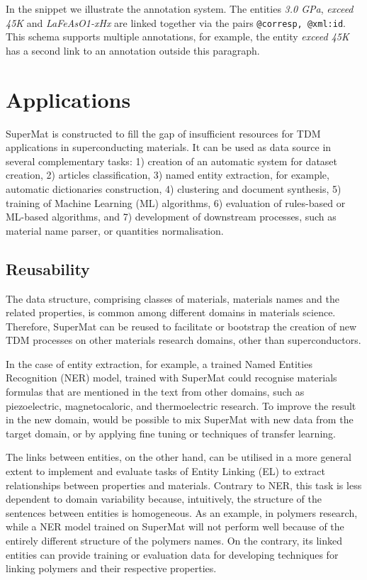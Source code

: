 \documentclass[fleqn,10pt]{wlscirep}
\begin{document}
In the snippet we illustrate the annotation system. The entities \textit{3.0 GPa}, \textit{exceed 45K} and \textit{LaFeAsO1-xHx} are linked together via the pairs \texttt{@corresp, @xml:id}. 
This schema supports multiple annotations, for example, the entity \textit{exceed 45K} has a second link to an annotation outside this paragraph.


\section*{Applications}
\label{sec:applications}
SuperMat is constructed to fill the gap of insufficient resources for TDM applications in superconducting materials. It can be used as data source in several complementary tasks: 
1) creation of an automatic system for dataset creation, 
2) articles classification, 
3) named entity extraction, for example, automatic dictionaries construction, 
4) clustering and document synthesis,
5) training of Machine Learning (ML) algorithms,
6) evaluation of rules-based or ML-based algorithms, and 
7) development of downstream processes, such as material name parser, or quantities normalisation.

\subsection*{Reusability}
The data structure, comprising classes of materials, materials names and the related properties, is common among different domains in materials science. 
Therefore, SuperMat can be reused to facilitate or bootstrap the creation of new TDM processes on other materials research domains, other than superconductors.

In the case of entity extraction, for example, a trained Named Entities Recognition (NER) model, trained with SuperMat could recognise materials formulas that are mentioned in the text from other domains, such as piezoelectric, magnetocaloric, and thermoelectric research.
To improve the result in the new domain, would be possible to mix SuperMat with new data from the target domain, or by applying fine tuning or techniques of transfer learning. 

The links between entities, on the other hand, can be utilised in a more general extent to implement and evaluate tasks of Entity Linking (EL) to extract relationships between properties and materials. 
Contrary to NER, this task is less dependent to domain variability because, intuitively, the structure of the sentences between entities is homogeneous.
As an example, in polymers research, while a NER model trained on SuperMat will not perform well because of the entirely different structure of the polymers names. On the contrary, its linked entities can provide training or evaluation data for developing techniques for linking polymers and their respective properties.
\end{document}
